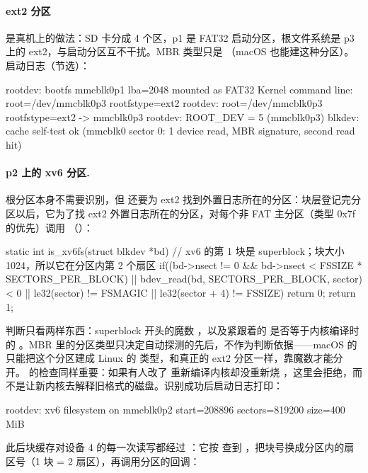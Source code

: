 \paragraph{ext2 分区}是真机上的做法：SD 卡分成 4 个区，p1 是 FAT32 启动分区，根文件系统是 p3 上的 ext2，与启动分区互不干扰。MBR 类型只是 （macOS 也能建这种分区）。启动日志（节选）：

\begin{txtcode}
rootdev: bootfs mmcblk0p1 lba=2048 mounted as FAT32
Kernel command line: root=/dev/mmcblk0p3 rootfstype=ext2
rootdev: root=/dev/mmcblk0p3 rootfstype=ext2 -> mmcblk0p3
rootdev: ROOT_DEV = 5 (mmcblk0p3)
blkdev: cache self-test ok (mmcblk0 sector 0: 1 device read, MBR signature, second read hit)
\end{txtcode}

\paragraph{p2 上的 xv6 分区.} 根分区本身不需要识别，但  还要为 ext2 找到外置日志所在的分区：块层登记完分区以后，它为了找 ext2 外置日志所在的分区，对每个非 FAT 主分区（类型 0x7f 的优先）调用 （）：

\begin{ccode}
static int is_xv6fs(struct blkdev *bd) {
  // xv6 的第 1 块是 superblock；块大小 1024，所以它在分区内第 2 个扇区
  if((bd->nsect != 0 && bd->nsect < FSSIZE * SECTORS_PER_BLOCK) ||
     bdev_read(bd, SECTORS_PER_BLOCK, sector) < 0 ||
     le32(sector) != FSMAGIC || le32(sector + 4) != FSSIZE)
    return 0;
  return 1;
}
\end{ccode}

判断只看两样东西：superblock 开头的魔数 ，以及紧跟着的  是否等于内核编译时的 。MBR 里的分区类型只决定自动探测的先后，不作为判断依据——macOS 的  只能把这个分区建成 Linux 的  类型，和真正的 ext2 分区一样，靠魔数才能分开。 的检查同样重要：如果有人改了  重新编译内核却没重新烧 ，这里会拒绝，而不是让新内核去解释旧格式的磁盘。识别成功后启动日志打印：

\begin{txtcode}
rootdev: xv6 filesystem on mmcblk0p2 start=208896 sectors=819200 size=400 MiB
\end{txtcode}

此后块缓存对设备 4 的每一次读写都经过 ：它按  查到 ，把块号换成分区内的扇区号（1 块 = 2 扇区），再调用分区的回调：


